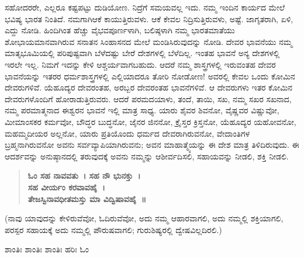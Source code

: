 \vskip 3pt

ಸಹೋದರರೇ, ಎಲ್ಲರೂ ಕಷ್ಟಪಟ್ಟು ದುಡಿಯೋಣ. ನಿದ್ರೆಗೆ ಸಮಯವಲ್ಲ ಇದು. ನಮ್ಮ ಇಂದಿನ ಕಾರ್ಯದ ಮೇಲೆ ಭವಿಷ್ಯ ಭಾರತ ನಿಂತಿದೆ. ನಮಗಾಗಿ\break ಆಕೆ ಕಾಯುತ್ತಿರುವಳು. ಆಕೆ ಕೇವಲ ನಿದ್ರಿಸುತ್ತಿರುವಳು, ಅಷ್ಟೆ. ಜಾಗೃತರಾಗಿ, ಏಳಿ, ಎದ್ದು ನೋಡಿ. ಹಿಂದಿಗಿಂತ ಹೆಚ್ಚು ವೈಭವಪೂರ್ಣಳಾಗಿ, ಬಲಿಷ್ಠಳಾಗಿ ನಮ್ಮ ಭಾರತಮಾತೆಯು ಶೋಭಾಯಮಾನವಾಗಿರುವ ಸನಾತನ ಸಿಂಹಾಸನದ ಮೇಲೆ ಮಂಡಿಸಿರುವುದನ್ನು ನೋಡಿ. ದೇವರ ಭಾವನೆಯು ನಮ್ಮ ಮಾತೃಭೂಮಿಯಲ್ಲಿ ಪರಿಪುಷ್ಟವಾಗಿ ಬೆಳೆದಷ್ಟು ಬೇರೆ ದೇಶಗಳಲ್ಲಿ ಬೆಳೆದಿಲ್ಲ. ಇಂತಹ ಭಾವನೆ ಅನ್ಯ ದೇಶಗಳಲ್ಲಿ ಇರಲೇ ಇಲ್ಲ. ನಿಮಗೆ ಇದನ್ನು ಕೇಳಿ ಆಶ್ಚರ್ಯವಾಗಬಹುದು. ಆದರೆ ನಮ್ಮ ಶಾಸ್ತ್ರಗಳಲ್ಲಿ ಇರುವಂತಹ ದೇವರ ಭಾವನೆಯನ್ನು ಇತರರ ಧರ್ಮಶಾಸ್ತ್ರಗಳಲ್ಲಿ ಎಲ್ಲಿಯಾದರೂ ತೋರಿ ನೋಡೋಣ! ಅವರಲ್ಲಿ ಕೇವಲ ಒಂದು ಕೋಮಿನ ದೇವರುಗಳಿವೆ. ಯೆಹೂದ್ಯರ ದೇವರಂತಹ, ಅರಬ್ಬರ ದೇವರಂತಹ ಭಾವನೆಗಳಿವೆ. ಆ ದೇವರುಗಳು ಇತರ ಕೋಮಿನ ದೇವರುಗಳೊಂದಿಗೆ ಹೋರಾಡುತ್ತಿರುವರು. ಆದರೆ ಪರಮದಯಾಳು, ತಂದೆ, ತಾಯಿ, ಸಖ, ನಮ್ಮ ಸಖರ ಸಖನಾದ, ನಮ್ಮ ಪರಮಾತ್ಮನಾದ ಈಶ್ವರನ ಭಾವನೆ ಇಲ್ಲಿ ಮಾತ್ರ ಸಾಧ್ಯ. ಯಾರು ಶೈವರ ಶಿವನೋ, ವೈಷ್ಣವರ ವಿಷ್ಣುವೋ, ಮೀಮಾಂಸಕರ ಕರ್ಮವೋ, ಬೌದ್ಧರ ಬುದ್ಧನೋ, ಜೈನರ ಜಿನನೋ, ಕ್ರೈಸ್ತರ ಕ್ರಿಸ್ತನೋ, ಯೆಹೂದ್ಯರ ಯಹೋವನೋ, ಮಹಮ್ಮದೀಯರ ಅಲ್ಲನೋ, ಯಾರು ಪ್ರತಿಯೊಂದು ಧರ್ಮದ ದೇವರಾಗಿರುವನೋ, ವೇದಾಂತಿಗಳ ಬ್ರಹ್ಮನಾಗಿರುವನೋ ಅವನು ಸರ್ವವ್ಯಾಪಿಯಾಗಿರುವನು; ಅವನ ಮಾಹಾತ್ಮ್ಯೆಯನ್ನು ಈ ದೇಶ ಮಾತ್ರ ತಿಳಿದಿರುವುದು. ಈ ಆದರ್ಶವನ್ನು ಅನುಷ್ಠಾನದಲ್ಲಿ ತರುವುದಕ್ಕೆ ಅವನು ನಮ್ಮನ್ನು ಆಶೀರ್ವದಿಸಲಿ, ಸಹಾಯವನ್ನು ನೀಡಲಿ, ಶಕ್ತಿ ನೀಡಲಿ.

\begin{verse}
\textbf{ಓಂ ಸಹ ನಾವವತು~। ಸಹ ನೌ ಭುನಕ್ತು~।\\ಸಹ ವೀರ್ಯಂ ಕರವಾವಹೈ~।}\\\textbf{ತೇಜಸ್ವಿನಾವಧೀತಮಸ್ತು ಮಾ ವಿದ್ವಿಷಾವಹೈ~॥}
\end{verse}

(ನಾವು ಯಾವುದನ್ನು ಕೇಳಿರುವೆವೋ, ಓದಿರುವೆವೋ, ಅದು ನಮ್ಮ ಆಹಾರವಾಗಲಿ, ಅದು ನಮ್ಮಲ್ಲಿ ಶಕ್ತಿಯಾಗಲಿ, ಪರಸ್ಪರ ಸಹಾಯಕ್ಕೆ ಅದು ನಮ್ಮಲ್ಲಿ ಪೌರುಷವಾಗಲಿ; ಗುರುಶಿಷ್ಯರಲ್ಲಿ ದ್ವೇಷವಿಲ್ಲದಿರಲಿ.)

\begin{center}
ಶಾಂತಿಃ ಶಾಂತಿಃ ಶಾಂತಿಃ ಹರಿಃ ಓಂ
\end{center}

